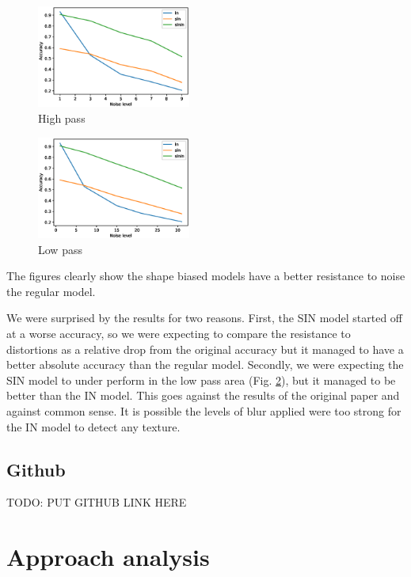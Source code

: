 \documentclass{article}
\begin{document}
\begin{figure}[h!]
\centering
\includegraphics[width = 0.45\textwidth]{imgs/high_pass}
\caption{High pass}
\label{high_pass}
\end{figure}

\begin{figure}[h!]
\centering
\includegraphics[width = 0.45\textwidth]{imgs/low_pass}
\caption{Low pass}
\label{low_pass}
\end{figure}

The figures clearly show the shape biased models have a better resistance to noise the regular model.

We were surprised by the results for two reasons.
First, the SIN model started off at a worse accuracy, so we were expecting to compare the resistance to distortions as a relative drop from the original accuracy but it managed to have a better absolute accuracy than the regular model.
Secondly, we were expecting the SIN model to under perform in the low pass area (Fig. \ref{low_pass}), but it managed to be better than the IN model. 
This goes against the results of the original paper and against common sense. 
It is possible the levels of blur applied were too strong for the IN model to detect any texture.

\subsection{Github}

TODO: PUT GITHUB LINK HERE

\newpage
\section{Approach analysis}
\end{document}
